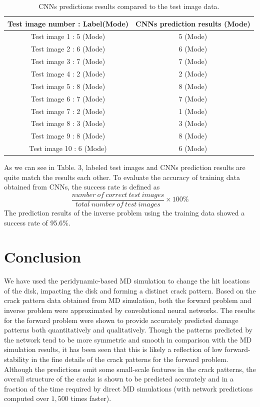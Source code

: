 \begin{table}[h!]
\centering
\caption{CNNs predictions results compared to the test image data.}
\label{tab:1}       
\begin{tabular}{c|c}
\hline
\hline
Test image number : Label(Mode) & CNNs prediction results (Mode) \\
\hline
Test image 1 : 5 (Mode) & 5 (Mode) \\
Test image 2 : 6 (Mode) & 6 (Mode) \\
Test image 3 : 7 (Mode) & 7 (Mode) \\
Test image 4 : 2 (Mode) & 2 (Mode) \\
Test image 5 : 8 (Mode) & 8 (Mode) \\
Test image 6 : 7 (Mode) & 7 (Mode) \\
Test image 7 : 2 (Mode) & 1 (Mode) \\
Test image 8 : 3 (Mode) & 3 (Mode) \\
Test image 9 : 8 (Mode) & 8 (Mode) \\
Test image 10 : 6 (Mode) & 6 (Mode) \\
\hline
\end{tabular}
\end{table}
As we can see in Table. 3, labeled test images and CNNs prediction results are quite match the results each other. To evaluate the accuracy of training data obtained from CNNs, the success rate is defined as
\begin{equation} 
\frac{number\ of\ correct\ test\ images}{total\ number\ of\ test\ images} \times 100\%
\end{equation}
The prediction results of the inverse problem using the training data showed a success rate of 95.6\%.
\section{Conclusion}
\label{sec:5}


We have used the peridynamic-based MD simulation to change the hit locations of the disk, impacting the disk and forming a distinct crack pattern. Based on the crack pattern data obtained from MD simulation, both the forward problem and inverse problem were approximated by convolutional neural networks.  The results for the forward problem were shown to provide accurately predicted damage patterns both quantitatively and qualitatively.  Though the patterns predicted by the network tend to be more symmetric and smooth in comparison with the MD simulation results, it has been seen that this is likely a reflection of low forward-stability in the fine details of the crack patterns for the forward problem.  Although the predictions omit some small-scale features in the crack patterns, the overall structure of the cracks is shown to be predicted accurately and in a fraction of the time required by direct MD simulations (with network predictions computed over $1,500$ times faster).

